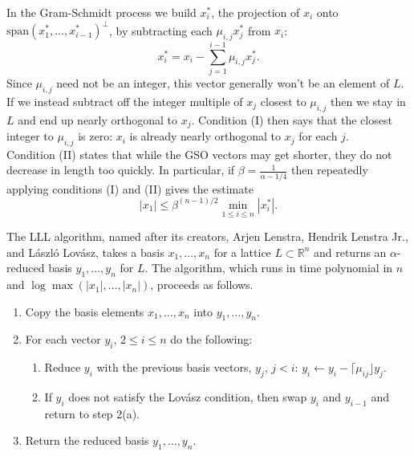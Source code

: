 \documentclass[11pt,letterpaper]{article}
\newcommand{\reals}{\mathbb{R}}
\theoremstyle{definition}
\begin{document}

\noindent In the Gram-Schmidt process we build $x_i^*$, the projection of $x_i$ onto $\text{span}(x_1^*, \ldots, x_{i-1}^*)^\perp$, by subtracting each $\mu_{i,j}x_j^*$ from $x_i$:
\[
x_i^* = x_i - \sum_{j=1}^{i-1}\mu_{i,j}x_j^*.
\]
Since $\mu_{i,j}$ need not be an integer, this vector generally won't be an element of $L$. If we instead subtract off the integer multiple of $x_j$ closest to $\mu_{i,j}$ then we stay in $L$ and end up nearly orthogonal to $x_j$. Condition (I) then says that the closest integer to $\mu_{i,j}$ is zero: $x_i$ is already nearly orthogonal to $x_j$ for each $j$.\\
\noindent Condition (II) states that while the GSO vectors may get shorter, they do not decrease in length too quickly. In particular, if $\beta = \frac{1}{\alpha-1/4}$ then repeatedly applying conditions (I) and (II) gives the estimate
\[
|x_1| \leq \beta^{(n-1)/2}\min_{1\leq i\leq n}|x_i^*|.
\]


\noindent The LLL algorithm, named after its creators, Arjen Lenstra, Hendrik Lenstra Jr., and L\'aszl\'o Lov\'asz, takes a basis $x_1, \ldots, x_n$ for a lattice $L\subset \reals^n$ and returns an $\alpha$-reduced basis $y_1, \ldots, y_n$ for $L$. The algorithm, which runs in time polynomial in $n$ and $\log \max(|x_1|, \ldots, |x_n|)$, proceeds as follows.
\begin{enumerate}
	\item Copy the basis elements $x_1, \ldots, x_n$ into $y_1, \ldots, y_n$.
	\item For each vector $y_i$, $2\leq i \leq n$ do the following:
	\begin{enumerate}
		\item Reduce $y_i$ with the previous basis vectors, $y_j$, $j<i$: $y_i \gets y_i - \lceil \mu_{ij}\rfloor y_j$.
		\item If $y_i$ does not satisfy the Lov\'asz condition, then swap $y_i$ and $y_{i-1}$ and return to step 2(a).
	\end{enumerate}
	\item Return the reduced basis $y_1, \ldots, y_n$.
\end{enumerate}
\end{document}
